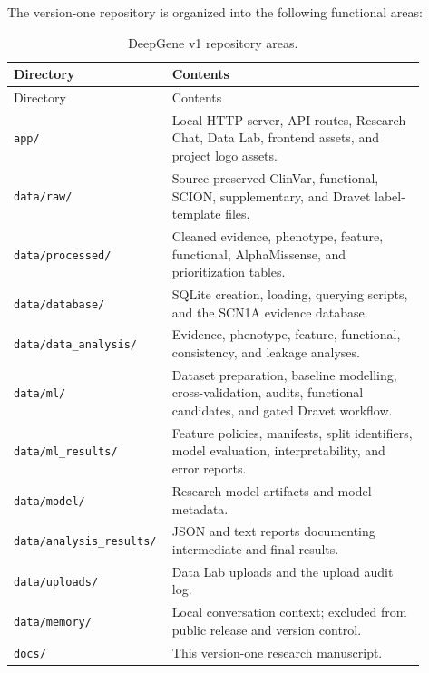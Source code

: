 \documentclass[12pt,a4paper]{article}
\newcommand{\code}[1]{\nolinkurl{#1}}
\begin{document}
The version-one repository is organized into the following functional areas:
\begin{longtable}{p{0.30\linewidth}p{0.60\linewidth}}
\caption{DeepGene v1 repository areas.}\label{tab:repository}\\
\toprule
Directory & Contents\\
\midrule
\endfirsthead
\toprule
Directory & Contents\\
\midrule
\endhead
\code{app/} & Local HTTP server, API routes, Research Chat, Data Lab, frontend assets, and project logo assets.\\
\code{data/raw/} & Source-preserved ClinVar, functional, SCION, supplementary, and Dravet label-template files.\\
\code{data/processed/} & Cleaned evidence, phenotype, feature, functional, AlphaMissense, and prioritization tables.\\
\code{data/database/} & SQLite creation, loading, querying scripts, and the SCN1A evidence database.\\
\code{data/data\_analysis/} & Evidence, phenotype, feature, functional, consistency, and leakage analyses.\\
\code{data/ml/} & Dataset preparation, baseline modelling, cross-validation, audits, functional candidates, and gated Dravet workflow.\\
\code{data/ml\_results/} & Feature policies, manifests, split identifiers, model evaluation, interpretability, and error reports.\\
\code{data/model/} & Research model artifacts and model metadata.\\
\code{data/analysis\_results/} & JSON and text reports documenting intermediate and final results.\\
\code{data/uploads/} & Data Lab uploads and the upload audit log.\\
\code{data/memory/} & Local conversation context; excluded from public release and version control.\\
\code{docs/} & This version-one research manuscript.\\
\bottomrule
\end{longtable}
\end{document}
